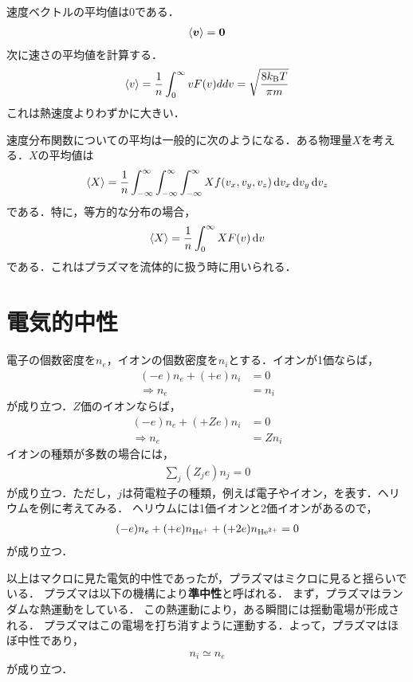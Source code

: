 \documentclass{report}
\begin{document}
  速度ベクトルの平均値は0である．
  \begin{align}
    \ev{\bm{v}} = \bm{0}
  \end{align}
  次に速さの平均値を計算する．
  \begin{align}
    \ev{v} = \frac{1}{n}\int_{0}^{\infty} v F(v) dd{v} = \sqrt{\frac{8 \kb T}{\pi m}}
  \end{align}
  これは熱速度よりわずかに大きい．
  \par
  速度分布関数についての平均は一般的に次のようになる．ある物理量$X$を考える．$X$の平均値は
  \begin{align}
    \ev{X} = \frac{1}{n}\int_{-\infty}^{\infty} \int_{-\infty}^{\infty} \int_{-\infty}^{\infty} Xf(v_x, v_y, v_z) \dd{v_x}\dd{v_y}\dd{v_z}
  \end{align}
  である．特に，等方的な分布の場合，
  \begin{align}
    \ev{X} = \frac{1}{n} \int_{0}^{\infty} XF(v) \dd{v}
  \end{align}
  である．これはプラズマを流体的に扱う時に用いられる．
  \section{電気的中性}
    電子の個数密度を$n_e$，イオンの個数密度を$n_i$とする．イオンが1価ならば，
    \begin{align}
      (-e)n_e + (+e)n_i &= 0\\
      \Rightarrow n_e &= n_i
    \end{align}
    が成り立つ．$Z$価のイオンならば，
    \begin{align}
      (-e)n_e + (+Ze)n_i &= 0\\
      \Rightarrow n_e &= Zn_i
    \end{align}
    イオンの種類が多数の場合には，
    \begin{align}
      \sum_{j} (Z_j e)n_j = 0
    \end{align}
    が成り立つ．ただし，$j$は荷電粒子の種類，例えば電子やイオン，を表す．ヘリウムを例に考えてみる．
    ヘリウムには1価イオンと2価イオンがあるので，
    \begin{align}
      (-e)n_e + (+e)n_{\mathrm{He}^{+}} + (+2e)n_{\mathrm{He}^{2+}} = 0
    \end{align}
    が成り立つ．
    \par
    以上はマクロに見た電気的中性であったが，プラズマはミクロに見ると揺らいでいる．
    プラズマは以下の機構により\textbf{準中性}と呼ばれる．
    まず，プラズマはランダムな熱運動をしている．
    この熱運動により，ある瞬間には揺動電場が形成される．
    プラズマはこの電場を打ち消すように運動する．よって，プラズマはほぼ中性であり，
    \begin{align}
      n_i \simeq n_e
    \end{align}
    が成り立つ．
\end{document}
